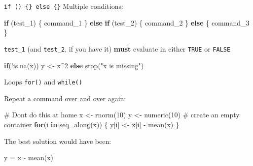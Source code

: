 \documentclass[
  ignorenonframetext,
]{beamer}
\newenvironment{Shaded}{\begin{snugshade}}{\end{snugshade}}
\newcommand{\CommentTok}[1]{\textcolor[rgb]{0.54,0.53,0.53}{#1}}
\newcommand{\ControlFlowTok}[1]{\textcolor[rgb]{0.12,0.11,0.11}{\textbf{#1}}}
\newcommand{\DecValTok}[1]{\textcolor[rgb]{0.69,0.50,0.00}{#1}}
\newcommand{\FunctionTok}[1]{\textcolor[rgb]{0.39,0.29,0.61}{#1}}
\newcommand{\NormalTok}[1]{\textcolor[rgb]{0.12,0.11,0.11}{#1}}
\newcommand{\OtherTok}[1]{\textcolor[rgb]{0.00,0.43,0.16}{#1}}
\newcommand{\SpecialCharTok}[1]{\textcolor[rgb]{0.24,0.68,0.91}{#1}}
\newcommand{\StringTok}[1]{\textcolor[rgb]{0.75,0.01,0.01}{#1}}
\begin{document}
\begin{frame}[fragile]{\texttt{if\ ()\ \{\}\ else\ \{\}}}
\protect\hypertarget{if-else-1}{}
Multiple conditions:

\begin{Shaded}
\begin{Highlighting}[]
\ControlFlowTok{if}\NormalTok{ (test\_1) \{}
\NormalTok{  command\_1}
\NormalTok{\} }\ControlFlowTok{else} \ControlFlowTok{if}\NormalTok{ (test\_2) \{}
\NormalTok{  command\_2}
\NormalTok{\} }\ControlFlowTok{else}\NormalTok{ \{}
\NormalTok{  command\_3}
\NormalTok{\}}
\end{Highlighting}
\end{Shaded}

\texttt{test\_1} (and \texttt{test\_2}, if you have it) \textbf{must}
evaluate in either \texttt{TRUE} or \texttt{FALSE}

\begin{Shaded}
\begin{Highlighting}[]
\ControlFlowTok{if}\NormalTok{(}\SpecialCharTok{!}\FunctionTok{is.na}\NormalTok{(x)) y }\OtherTok{\textless{}{-}}\NormalTok{ x}\SpecialCharTok{\^{}}\DecValTok{2} \ControlFlowTok{else} \FunctionTok{stop}\NormalTok{(}\StringTok{"x is missing"}\NormalTok{)}
\end{Highlighting}
\end{Shaded}
\end{frame}

\begin{frame}[fragile]{Loops}
\protect\hypertarget{loops}{}
\texttt{for()} and \texttt{while()}

Repeat a command over and over again:

\begin{Shaded}
\begin{Highlighting}[]
\CommentTok{\# Don\textquotesingle{}t do this at home}
\NormalTok{x }\OtherTok{\textless{}{-}} \FunctionTok{rnorm}\NormalTok{(}\DecValTok{10}\NormalTok{)      }
\NormalTok{y }\OtherTok{\textless{}{-}} \FunctionTok{numeric}\NormalTok{(}\DecValTok{10}\NormalTok{)   }\CommentTok{\# create an empty container }
\ControlFlowTok{for}\NormalTok{(i }\ControlFlowTok{in} \FunctionTok{seq\_along}\NormalTok{(x)) \{}
\NormalTok{y[i] }\OtherTok{\textless{}{-}}\NormalTok{ x[i] }\SpecialCharTok{{-}} \FunctionTok{mean}\NormalTok{(x)}
\NormalTok{\}}
\end{Highlighting}
\end{Shaded}

The best solution would have been:

\begin{Shaded}
\begin{Highlighting}[]
\NormalTok{y }\OtherTok{=}\NormalTok{ x }\SpecialCharTok{{-}} \FunctionTok{mean}\NormalTok{(x)}
\end{Highlighting}
\end{Shaded}
\end{frame}
\end{document}
